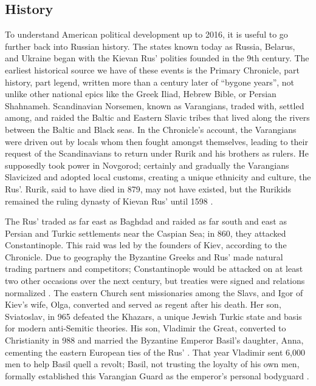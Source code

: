 \subsection{History}

To understand American political development up to 2016, it is useful to go further back into Russian history.
The states known today as Russia, Belarus, and Ukraine began with the Kievan Rus' polities founded in the 9th century.
The earliest historical source we have of these events is the Primary Chronicle, part history, part legend, written more than a century later of ``bygone years'', not unlike other national epics like the Greek Iliad, Hebrew Bible, or Persian Shahnameh.
Scandinavian Norsemen, known as Varangians, traded with, settled among, and raided the Baltic and Eastern Slavic tribes that lived along the rivers between the Baltic and Black seas.
In the Chronicle's account, the Varangians were driven out by locals whom then fought amongst themselves, leading to their request of the Scandinavians to return under Rurik and his brothers as rulers.
He supposedly took power in Novgorod; certainly and gradually the Varangians Slavicized and adopted local customs, creating a unique ethnicity and culture, the Rus'.
Rurik, said to have died in 879, may not have existed, but the Rurikids remained the ruling dynasty of Kievan Rus' until 1598 \cite[p.1-4,53]{bushkovitch2011}.

The Rus' traded as far east as Baghdad and raided as far south and east as Persian and Turkic settlements near the Caspian Sea; in 860, they attacked Constantinople. 
This raid was led by the founders of Kiev, according to the Chronicle. 
Due to geography the Byzantine Greeks and Rus' made natural trading partners and competitors; Constantinople would be attacked on at least two other occasions over the next century, but treaties were signed and relations normalized \cite[p.41-52]{gleason2009}.
The eastern Church sent missionaries among the Slavs, and Igor of Kiev's wife, Olga, converted and served as regent after his death.
Her son, Sviatoslav, in 965 defeated the Khazars, a unique Jewish Turkic state and basis for modern anti-Semitic theories.
His son, Vladimir the Great, converted to Christianity in 988 and married the Byzantine Emperor Basil's daughter, Anna, cementing the eastern European ties of the Rus' \cite[p.6-8]{bushkovitch2011}.
That year Vladimir sent 6,000 men to help Basil quell a revolt; Basil, not trusting the loyalty of his own men, formally established this Varangian Guard as the emperor's personal bodyguard \cite{gleason2009}.

